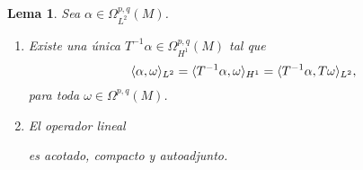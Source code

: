\documentclass[12pt,a4paper]{article}
\newtheorem{lema}[thm]{Lema}
\theoremstyle{definition} \newtheorem{defn}[thm]{Definición}
\theoremstyle{definition} \newtheorem{ejemplo}[thm]{Ejemplo}
\theoremstyle{definition} \newtheorem{ejercicio}[thm]{Ejercicio}
\theoremstyle{remark} \newtheorem*{obs}{Observación}
\DeclarePairedDelimiter\esc{\langle}{\rangle}
\begin{document}
    \begin{lema}
      Sea $\alpha \in \Omega^{p,q}_{L^2}(M)$.
      \begin{enumerate}
	\item Existe una única $T^{-1}\alpha \in \Omega^{p,q}_{H^1}(M)$ tal que
	  \begin{equation*}
	    \esc{\alpha,\omega}_{L^2}=\esc{T^{-1}\alpha,\omega}_{H^1}=\esc{T^{-1}\alpha,T\omega}_{L^2},
	  \end{equation*}
	  para toda $\omega \in \Omega^{p,q}(M)$.
	\item El operador lineal
	  \begin{center}
	  \end{center}
	  es acotado, compacto y autoadjunto.
      \end{enumerate}
    \end{lema}
\end{document}
